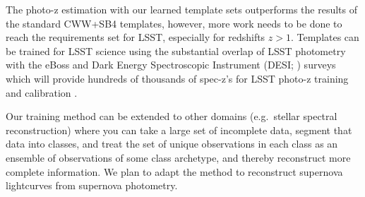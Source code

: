 The photo-z estimation with our learned template sets outperforms the results of the standard CWW+SB4 templates, however, more work needs to be done to reach the requirements set for LSST, especially for redshifts $z>1$.
Templates can be trained for LSST science using the substantial overlap of LSST photometry with the eBoss \citep{Dawson2016} and Dark Energy Spectroscopic Instrument (DESI; \citealt{DESICollaboration2016}) surveys which will provide hundreds of thousands of spec-z's for LSST photo-z training and calibration \citep{Schmidt2014,Newman2015}.

Our training method can be extended to other domains (e.g.\ stellar spectral reconstruction) where you can take a large set of incomplete data, segment that data into classes, and treat the set of unique observations in each class as an ensemble of observations of some class archetype, and thereby reconstruct more complete information.
We plan to adapt the method to reconstruct supernova lightcurves from supernova photometry.
